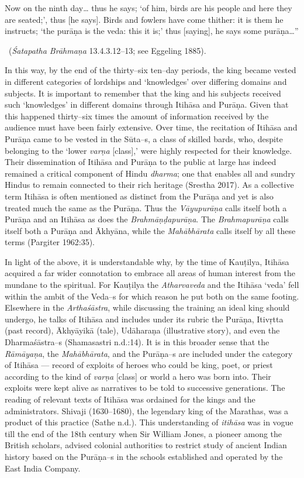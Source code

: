 \begin{myquote}
Now on the ninth day… thus he says; ‘of him, birds are his people and here they are seated;’, thus [he says]. Birds and fowlers have come thither: it is them he instructs; ‘the purāṇa is the veda: this it is;’ thus [saying], he says some purāṇa…” 

~\hfill (\textit{Śatapatha Brāhmaṇa} 13.4.3.12–13; see Eggeling 1885).
\end{myquote}

In this way, by the end of the thirty–six ten–day periods, the king became vested in different categories of lordships and ‘knowledges’ over differing domains and subjects. It is important to remember that the king and his subjects received such ‘knowledges’ in different domains through Itihāsa and Purāṇa. Given that this happened thirty–six times the amount of information received by the audience must have been fairly extensive. Over time, the recitation of Itihāsa and Purāṇa came to be vested in the Sūta–s, a class of skilled bards, who, despite belonging to the ‘lower \textit{varṇa} [class],’ were highly respected for their knowledge. Their dissemination of Itihāsa and Purāṇa to the public at large has indeed remained a critical component of Hindu \textit{dharma}; one that enables all and sundry Hindus to remain connected to their rich heritage (Srestha 2017). As a collective term Itihāsa is often mentioned as distinct from the Purāṇa and yet is also treated much the same as the Purāṇa. Thus the \textit{Vāyupurāṇa} calls itself both a Purāṇa and an Itihāsa as does the \textit{Brahmāṇḍapurāṇa}. The \textit{Brahmapurāṇa} calls itself both a Purāṇa and Ākhyāna, while the \textit{Mahābhārata} calls itself by all these terms (Pargiter 1962:35).

In light of the above, it is understandable why, by the time of Kauṭilya, Itihāsa acquired a far wider connotation to embrace all areas of human interest from the mundane to the spiritual. For Kauṭilya the \textit{Atharvaveda} and the Itihāsa ‘veda’ fell within the ambit of the Veda–s for which reason he put both on the same footing. Elsewhere in the \textit{Arthaśāstra}, while discussing the training an ideal king should undergo, he talks of Itihāsa and includes under its rubric the Purāṇa, Itivṛtta (past record), Ākhyāyikā (tale), Udāharaṇa (illustrative story), and even the Dharmaśāstra–s (Shamasastri n.d.:14). It is in this broader sense that the \textit{Rāmāyaṇa}, the \textit{Mahābhārata}, and the Purāṇa–s are included under the category of Itihāsa — record of exploits of heroes who could be king, poet, or priest according to the kind of \textit{varṇa} [class] or world a hero was born into. Their exploits were kept alive as narratives to be told to successive generations. The reading of relevant texts of Itihāsa was ordained for the kings and the administrators. Shivaji (1630–1680), the legendary king of the Marathas, was a product of this practice (Sathe n.d.). This understanding of \textit{itihāsa} was in vogue till the end of the 18th century when Sir William Jones, a pioneer among the British scholars, advised colonial authorities to restrict study of ancient Indian history based on the Purāṇa–s in the schools established and operated by the East India Company.


